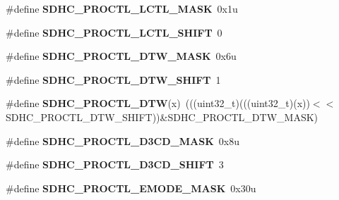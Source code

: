 \begin{DoxyCompactItemize}
\item 
\#define {\bfseries S\+D\+H\+C\+\_\+\+P\+R\+O\+C\+T\+L\+\_\+\+L\+C\+T\+L\+\_\+\+M\+A\+SK}~0x1u\hypertarget{group__SDHC__Register__Masks_ga482b0e558b7376a5e14f47bffdcb33c1}{}\label{group__SDHC__Register__Masks_ga482b0e558b7376a5e14f47bffdcb33c1}

\item 
\#define {\bfseries S\+D\+H\+C\+\_\+\+P\+R\+O\+C\+T\+L\+\_\+\+L\+C\+T\+L\+\_\+\+S\+H\+I\+FT}~0\hypertarget{group__SDHC__Register__Masks_ga754a95dd49bc69dbc62ae443f1c12d16}{}\label{group__SDHC__Register__Masks_ga754a95dd49bc69dbc62ae443f1c12d16}

\item 
\#define {\bfseries S\+D\+H\+C\+\_\+\+P\+R\+O\+C\+T\+L\+\_\+\+D\+T\+W\+\_\+\+M\+A\+SK}~0x6u\hypertarget{group__SDHC__Register__Masks_gabd8aa52532f5ddcfe86bbd56dd467aaa}{}\label{group__SDHC__Register__Masks_gabd8aa52532f5ddcfe86bbd56dd467aaa}

\item 
\#define {\bfseries S\+D\+H\+C\+\_\+\+P\+R\+O\+C\+T\+L\+\_\+\+D\+T\+W\+\_\+\+S\+H\+I\+FT}~1\hypertarget{group__SDHC__Register__Masks_ga7738f58de3f0c8a3c55fdf494fa9b7a5}{}\label{group__SDHC__Register__Masks_ga7738f58de3f0c8a3c55fdf494fa9b7a5}

\item 
\#define {\bfseries S\+D\+H\+C\+\_\+\+P\+R\+O\+C\+T\+L\+\_\+\+D\+TW}(x)~(((uint32\+\_\+t)(((uint32\+\_\+t)(x))$<$$<$S\+D\+H\+C\+\_\+\+P\+R\+O\+C\+T\+L\+\_\+\+D\+T\+W\+\_\+\+S\+H\+I\+FT))\&S\+D\+H\+C\+\_\+\+P\+R\+O\+C\+T\+L\+\_\+\+D\+T\+W\+\_\+\+M\+A\+SK)\hypertarget{group__SDHC__Register__Masks_gae2aac9ca891c75cdd5355a7cc7b012e8}{}\label{group__SDHC__Register__Masks_gae2aac9ca891c75cdd5355a7cc7b012e8}

\item 
\#define {\bfseries S\+D\+H\+C\+\_\+\+P\+R\+O\+C\+T\+L\+\_\+\+D3\+C\+D\+\_\+\+M\+A\+SK}~0x8u\hypertarget{group__SDHC__Register__Masks_ga597b9ab57f2ad515508d8b2e8b3832c7}{}\label{group__SDHC__Register__Masks_ga597b9ab57f2ad515508d8b2e8b3832c7}

\item 
\#define {\bfseries S\+D\+H\+C\+\_\+\+P\+R\+O\+C\+T\+L\+\_\+\+D3\+C\+D\+\_\+\+S\+H\+I\+FT}~3\hypertarget{group__SDHC__Register__Masks_ga9bd9fc5a38a643e4a04f03026a18e55a}{}\label{group__SDHC__Register__Masks_ga9bd9fc5a38a643e4a04f03026a18e55a}

\item 
\#define {\bfseries S\+D\+H\+C\+\_\+\+P\+R\+O\+C\+T\+L\+\_\+\+E\+M\+O\+D\+E\+\_\+\+M\+A\+SK}~0x30u\hypertarget{group__SDHC__Register__Masks_ga18ccde546ac8eb940360a8ff3671723b}{}\label{group__SDHC__Register__Masks_ga18ccde546ac8eb940360a8ff3671723b}


\end{DoxyCompactItemize}
